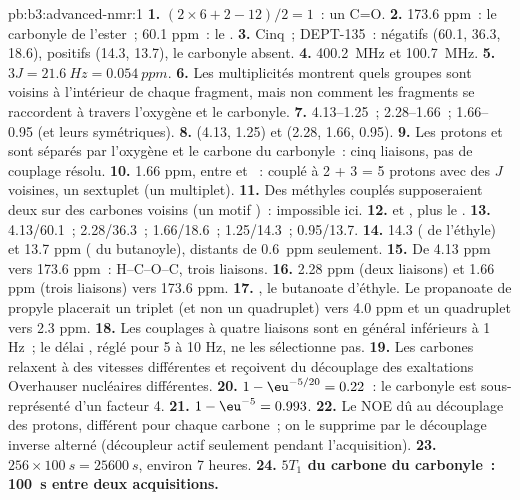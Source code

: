 \begin{solution}{pb:b3:advanced-nmr:1}
\textbf{1.} $(2 \times 6 + 2 - 12)/2 = 1$~: un C=O.
\textbf{2.} 173.6 ppm~: le carbonyle de l'ester~; 60.1 ppm~: le .
\textbf{3.} Cinq~; DEPT-135~:  négatifs (60.1, 36.3, 18.6),
 positifs (14.3,
13.7), le carbonyle absent.
\textbf{4.} \qty{400.2}{MHz} et \qty{100.7}{MHz}.
\textbf{5.} $3J = \qty{21.6}{Hz} = \qty{0.054}{ppm}$.
\textbf{6.} Les multiplicités montrent quels groupes sont voisins à
l'intérieur de chaque fragment, mais non comment les fragments se
raccordent à travers l'oxygène et le carbonyle.
\textbf{7.} 4.13--1.25~; 2.28--1.66~; 1.66--0.95 (et leurs symétriques).
\textbf{8.}  (4.13, 1.25) et  (2.28, 1.66, 0.95).
\textbf{9.} Les protons  et  sont séparés par
l'oxygène et le carbone du carbonyle~: cinq liaisons, pas de couplage
résolu.
\textbf{10.} 1.66 ppm, entre  et ~: couplé à
2 + 3 = 5 protons avec des $J$
voisines, un sextuplet (un multiplet).
\textbf{11.} Des méthyles couplés supposeraient deux  sur des
carbones voisins (un motif )~: impossible ici.
\textbf{12.}  et , plus le .
\textbf{13.} 4.13/60.1~; 2.28/36.3~; 1.66/18.6~; 1.25/14.3~; 0.95/13.7.
\textbf{14.} 14.3 ( de l'éthyle) et 13.7 ppm ( du
butanoyle), distants de \qty{0.6}{ppm} seulement.
\textbf{15.} De 4.13 ppm vers 173.6 ppm~: H--C--O--C, trois liaisons.
\textbf{16.} 2.28 ppm (deux liaisons) et 1.66 ppm (trois liaisons) vers
173.6 ppm.
\textbf{17.} , le butanoate d'éthyle. Le
propanoate de propyle placerait un triplet
 (et non un quadruplet) vers 4.0 ppm et un quadruplet vers
2.3 ppm.
\textbf{18.} Les couplages à quatre liaisons sont en général inférieurs à
1 Hz~; le délai , réglé pour 5 à 10 Hz, ne les sélectionne pas.
\textbf{19.} Les carbones relaxent à des vitesses différentes et reçoivent
du découplage des exaltations Overhauser nucléaires différentes.
\textbf{20.} $1 - \eu^{-5/20} = 0.22$~: le carbonyle est sous-représenté
d'un facteur 4.
\textbf{21.} $1 - \eu^{-5} = 0.993$.
\textbf{22.} Le NOE dû au découplage des protons, différent pour chaque
carbone~; on le supprime par le découplage inverse alterné (découpleur
actif seulement pendant l'acquisition).
\textbf{23.} $256 \times \qty{100}{s} = \qty{25600}{s}$, environ 7 heures.
\textbf{24.} \textbf{$5T_1$ du carbone du carbonyle~: \qty{100}{s} entre
deux acquisitions.}
\end{solution}
